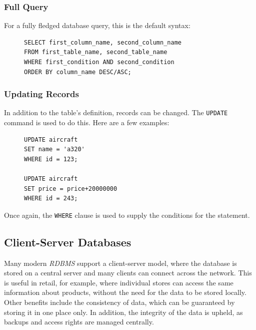 \documentclass[9pt]{article}
\begin{document}
\subsubsection{Full Query}
\label{sec:org5c8e25c}

For a fully fledged database query, this is the default syntax:

\begin{figure}[H]
\begin{verbatim}
SELECT first_column_name, second_column_name
FROM first_table_name, second_table_name
WHERE first_condition AND second_condition
ORDER BY column_name DESC/ASC;
\end{verbatim}
\end{figure}

\subsubsection{Updating Records}
\label{sec:orgd25d636}

In addition to the table's definition, records can be changed. The \texttt{UPDATE} command is used to do this. Here are a few examples:

\begin{figure}[H]
\begin{verbatim}
UPDATE aircraft
SET name = 'a320'
WHERE id = 123;

UPDATE aircraft
SET price = price+20000000
WHERE id = 243;
\end{verbatim}
\end{figure}

Once again, the \texttt{WHERE} clause is used to supply the conditions for the statement.

\subsection{Client-Server Databases}
\label{sec:orgd712c4f}

Many modern \emph{RDBMS} support a client-server model, where the database is stored on a central server and many clients can connect across the network. This is useful in retail, for example, where individual stores can access the same information about products, without the need for the data to be stored locally. Other benefits include the consistency of data, which can be guaranteed by storing it in one place only. In addition, the integrity of the data is upheld, as backups and access rights are managed centrally.
\end{document}
